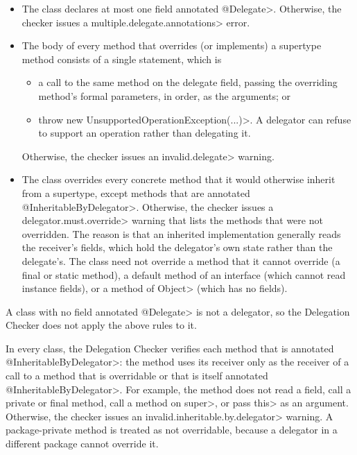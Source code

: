 \begin{itemize}
\item
  The class declares at most one field annotated \<@Delegate>.  Otherwise,
  the checker issues a \<multiple.delegate.annotations> error.
\item
  The body of every method that overrides (or implements) a supertype
  method consists of a single statement, which is
  \begin{itemize}
  \item
    a call to the same method on the delegate field, passing the
    overriding method's formal parameters, in order, as the arguments; or
  \item
    \<throw new UnsupportedOperationException(...)>.  A delegator can
    refuse to support an operation rather than delegating it.
  \end{itemize}
  Otherwise, the checker issues an \<invalid.delegate> warning.
\item
  The class overrides every concrete method that it would otherwise
  inherit from a supertype, except methods that are annotated
  \<@InheritableByDelegator>.  Otherwise, the checker issues a
  \<delegator.must.override> warning that lists the methods that were not
  overridden.  The reason is that an inherited implementation generally
  reads the receiver's fields, which hold the delegator's own state rather
  than the delegate's.  The class need not override a method that it
  cannot override (a final or static method), a default method of an
  interface (which cannot read instance fields), or a method of \<Object>
  (which has no fields).
\end{itemize}

A class with no field annotated \<@Delegate> is not a delegator, so the
Delegation Checker does not apply the above rules to it.

In every class, the Delegation Checker verifies each method that is
annotated \<@InheritableByDelegator>:  the method uses its receiver only as
the receiver of a call to a method that is overridable or that is itself
annotated \<@InheritableByDelegator>.  For example, the method does not
read a field, call a private or final method, call a method on \<super>, or
pass \<this> as an argument.  Otherwise, the checker issues an
\<invalid.inheritable.by.delegator> warning.  A package-private method is
treated as not overridable, because a delegator in a different package
cannot override it.



